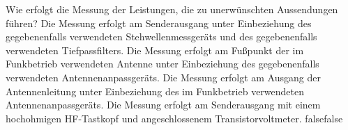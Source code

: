     {Wie erfolgt die Messung der Leistungen, die zu unerwünschten Aussendungen führen?}
    {Die Messung erfolgt am Senderausgang unter Einbeziehung des gegebenenfalls verwendeten Stehwellenmessgeräts und des gegebenenfalls verwendeten Tiefpassfilters.}
    {Die Messung erfolgt am Fußpunkt der im Funkbetrieb verwendeten Antenne unter Einbeziehung des gegebenenfalls verwendeten Antennenanpassgeräts.}
    {Die Messung erfolgt am Ausgang der Antennenleitung unter Einbeziehung des im Funkbetrieb verwendeten Antennenanpassgeräts.}
    {Die Messung erfolgt am Senderausgang mit einem hochohmigen HF-Tastkopf und angeschlossenem Transistorvoltmeter.}
    {false}{false}